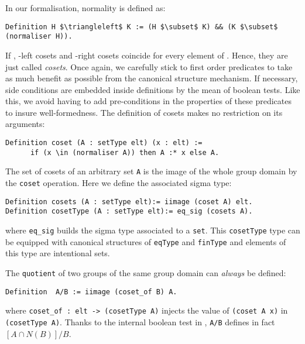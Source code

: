 In our formalisation, normality is defined as:
\begin{lstlisting}
Definition H $\triangleleft$ K := (H $\subset$ K) && (K $\subset$ (normaliser H)).
\end{lstlisting}
If , -left cosets and -right cosets coincide
for every element of . Hence, they are just called \emph{cosets}.
Once again, we carefully stick to first order predicates to take as
much benefit as possible from the canonical structure
mechanism. If necessary, side conditions are embedded inside
definitions by the mean of boolean tests. Like this, we avoid having
to add pre-conditions in the properties of these predicates to insure well-formedness.
The definition of cosets makes no restriction on its
arguments:

\begin{lstlisting}
Definition coset (A : setType elt) (x : elt) := 
      if (x \in (normaliser A)) then A :* x else A.
\end{lstlisting}

The set of cosets of an arbitrary set \lstinline[basicstyle=\footnotesize]+A+
is the image of the whole group domain by the \lstinline[basicstyle=\footnotesize]+coset+
operation. Here we define the associated sigma type:
\begin{lstlisting}
Definition cosets (A : setType elt):= iimage (coset A) elt.
Definition cosetType (A : setType elt):= eq_sig (cosets A).
\end{lstlisting}
\noindent where \lstinline[basicstyle=\footnotesize]+eq_sig+ builds the sigma type associated to a
\lstinline[basicstyle=\footnotesize]+set+. This
\lstinline[basicstyle=\footnotesize]+cosetType+ type can be equipped
with canonical structures of
\lstinline[basicstyle=\footnotesize]+eqType+ and
\lstinline[basicstyle=\footnotesize]+finType+ and elements of this type are intentional sets.

\noindent The \lstinline[basicstyle=\footnotesize]+quotient+ of two groups of the same group domain can
\emph{always} be defined:

\begin{lstlisting}
Definition  A/B := iimage (coset_of B) A.
\end{lstlisting}
\noindent where 
\lstinline[basicstyle=\footnotesize]+coset_of : elt -> (cosetType A)+ injects the
value of \lstinline[basicstyle=\footnotesize]+(coset A x)+ in
\lstinline[basicstyle=\footnotesize]+(cosetType A)+. Thanks to the internal boolean test in ,
\lstinline[basicstyle=\footnotesize]+A/B+ defines in fact $[A \cap N(B)]/B$.


